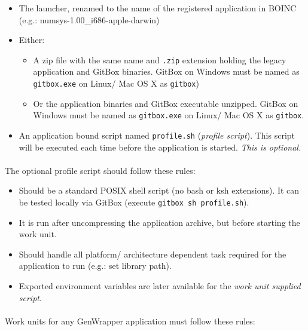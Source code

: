 \documentclass[a4paper,12pt,titlepage,dvipdfm]{article}
\begin{document}
\begin{itemize}
    \item The launcher, renamed to the name of the registered application in BOINC (e.g.: numsys-1.00\_i686-apple-darwin)
    \item Either:
        \begin{itemize}
            \item A zip file with the same name and \texttt{.zip} extension holding the legacy application and GitBox binaries. GitBox on Windows must be named as \texttt{gitbox.exe} on Linux/ Mac OS X as \texttt{gitbox})
            \item Or the application binaries and GitBox executable unzipped. GitBox on Windows must be named as \texttt{gitbox.exe} on Linux/ Mac OS X as \texttt{gitbox}.
        \end{itemize}
    \item An application bound script named \texttt{profile.sh} (\emph{profile script}). This script will be executed each time before the application is started. \emph{This is optional.}
\end{itemize}

\paragraph*{}The optional profile script should follow these rules:

\begin{itemize}
    \item Should be a standard POSIX shell script (no bash or ksh extensions). It can be tested locally via GitBox (execute \texttt{gitbox sh profile.sh}).
    \item It is run after uncompressing the application archive, but before starting the work unit.
    \item Should handle all platform/ architecture dependent task required for the application to run (e.g.: set library path).
    \item Exported environment variables are later available for the \emph{work unit supplied script}.   
\end{itemize}

\paragraph*{}Work units for any GenWrapper application must follow these rules:
\end{document}

